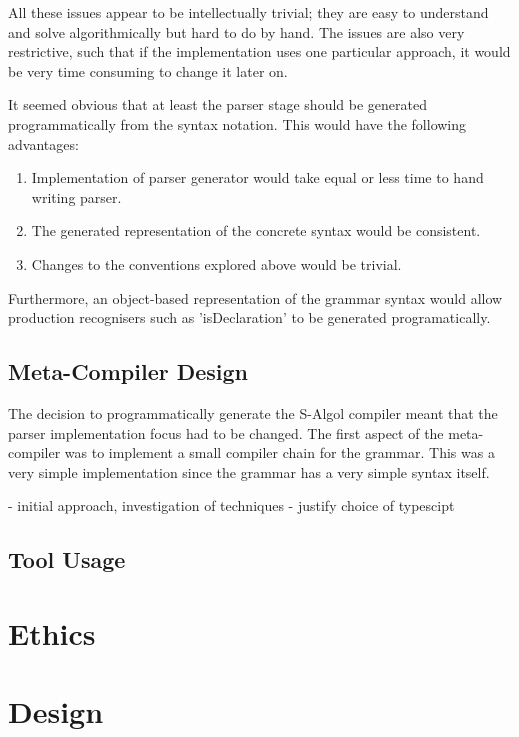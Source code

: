 \documentclass{article}
\begin{document}
All these issues appear to be intellectually trivial; they are easy to understand and solve algorithmically but hard to do by hand. The issues are also very restrictive, such that if the implementation uses one particular approach, it would be very time consuming to change it later on.

It seemed obvious that at least the parser stage should be generated programmatically from the syntax notation. This would have the following advantages:

\begin{enumerate}
\item Implementation of parser generator would take equal or less time to hand writing parser.
\item The generated representation of the concrete syntax would be consistent.
\item Changes to the conventions explored above would be trivial.
\end{enumerate}

Furthermore, an object-based representation of the grammar syntax would allow production recognisers such as 'isDeclaration' to be generated programatically.

\subsection{Meta-Compiler Design}

The decision to programmatically generate the S-Algol compiler meant that the parser implementation focus had to be changed. The first aspect of the meta-compiler was to implement a small compiler chain for the grammar. This was a very simple implementation since the grammar has a very simple syntax itself.



- initial approach, investigation of techniques
- justify choice of typescipt

\subsection{Tool Usage}

\section{Ethics}

\section{Design}
 
\end{document}
